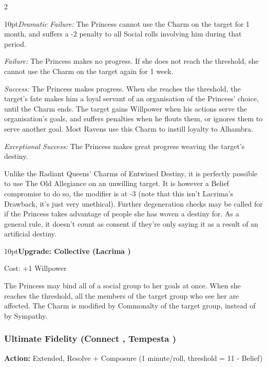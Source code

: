 \begin{multicols}{2}
\begin{myindentpar}{10pt}\emph{Dramatic Failure:} The Princess cannot use the Charm on the target for 1 month, and suffers a -2 penalty to all Social rolls involving him during that period.

\emph{Failure:} The Princess makes no progress. If she does not reach the threshold, she cannot use the Charm on the target again for 1 week.

\emph{Success:} The Princess makes progress. When she reaches the threshold, the target's fate makes him a loyal servant of an organisation of the Princess' choice, until the Charm ends. The target gains Willpower when his actions serve the organisation's goals, and suffers penalties when he flouts them, or ignores them to serve another goal. Most Ravens use this Charm to instill loyalty to Alhambra. 

\emph{Exceptional Success:} The Princess makes great progress weaving the target's destiny.\end{myindentpar}

\noindent Unlike the Radiant Queens' Charms of Entwined Destiny, it is perfectly possible to use The Old Allegiance on an unwilling target. It is however a Belief compromise to do so, the modifier is at -3 (note that this isn't Lacrima's Drawback, it's just very unethical). Further degeneration checks may be called for if the Princess takes advantage of people she has woven a destiny for. As a general rule, it doesn't count as consent if they're only saying it as a result of an artificial destiny.

\begin{myindentpar}{10pt}\textbf{Upgrade: Collective (Lacrima \textbullet\textbullet\textbullet\textbullet)}

Cost: +1 Willpower

The Princess may bind all of a social group to her goals at once. When she reaches the threshold, all the members of the target group who see her are affected. The Charm is modified by Commonalty of the target group, instead of by Sympathy.\end{myindentpar}

\subsubsection*{Ultimate Fidelity (Connect \textbullet\textbullet\textbullet\textbullet, Tempesta \textbullet\textbullet\textbullet)}

\noindent \textbf{Action:} Extended, Resolve + Composure (1 minute/roll, threshold = 11 - Belief)


\end{multicols}
